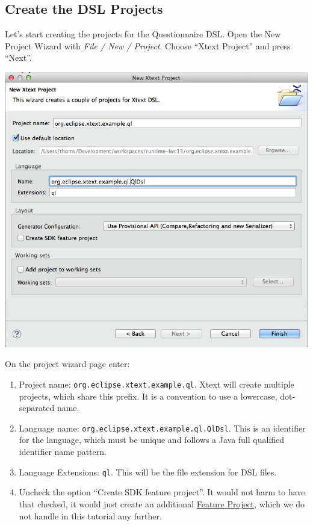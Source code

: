 \subsection{Create the DSL Projects} \label{chp:CreateDslProjects}

Let's start creating the projects for the Questionnaire DSL. Open the New
Project Wizard with \emph{File / New / Project}. Choose ``Xtext Project'' and press
``Next''.

\includegraphics[width=17cm]{./images/chapter01/NewXtextProjectWizard.png}

On the project wizard page enter:
\begin{enumerate}
  \item Project name: \texttt{org.eclipse.xtext.example.ql}. Xtext will create
  multiple projects, which share this prefix. It is a convention to use
  a lowercase, dot-separated name.
  \item Language name: \texttt{org.eclipse.xtext.example.ql.QlDsl}. This is an
  identifier for the language, which must be unique and follows a Java
  full qualified identifier name pattern.
  \item Language Extensions: \texttt{ql}. This will be the file extension for
  DSL files.
  \item Uncheck the option ``Create SDK feature project''. It would not harm to
  have that checked, it would just create an additional
  \href{http://www.vogella.com/articles/EclipseFeatureProject/article.html}{Feature
  Project}, which we do not handle in this tutorial any further.
\end{enumerate}

